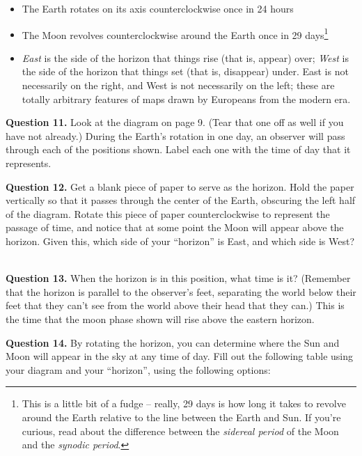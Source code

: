 \documentclass[11pt]{article}
\begin{document}
\begin{itemize}
	\item The Earth rotates on its axis counterclockwise once in 24 hours
	\item The Moon revolves counterclockwise around the Earth once in 29 days\footnote{This is a little bit of a fudge -- really, 29 days is how long it takes to revolve around the Earth relative to the line between the Earth and Sun. If you're curious, read about the difference between the {\it sidereal period} of the Moon and the {\it synodic period}.}
	\item {\it East} is the side of the horizon that things rise (that is, appear) over; {\it West} is the side of the horizon that things set (that is, disappear) under. East is not necessarily on the right, and West is not necessarily on the left; these are totally arbitrary features of maps drawn by Europeans from the modern era.
\end{itemize}


\textbf{Question 11.} Look at the diagram on page 9. (Tear that one off as well if you have not already.) During the Earth's rotation in one day, an observer will pass through each of the positions shown. Label each one with the time of day that it represents.

\textbf{Question 12.} Get a blank piece of paper to serve as the horizon. Hold the paper vertically so that it passes through the center of the Earth, obscuring the left half of the diagram. Rotate this piece of paper counterclockwise to represent the passage of time, and notice that at some point the Moon will appear above the horizon. Given this, which side of your ``horizon'' is East, and which side is West?

\vspace{1.5in}
\hrulefill\\

\textbf{Question 13.} When the horizon is in this position, what time is it? (Remember that the horizon is parallel to the observer's feet, separating the world below their feet that they can't see from the world above their head that they can.) This is the time that the moon phase shown will rise above the eastern horizon.


\newpage

\textbf{Question 14.} By rotating the horizon, you can determine where the Sun and Moon will appear in the sky at any time of day. Fill out the following table using your diagram and your ``horizon'', using the following options:
\end{document}
